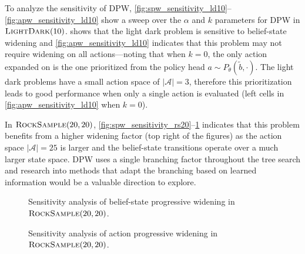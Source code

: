 To analyze the sensitivity of DPW, \cref{fig:spw_sensitivity_ld10}--\ref{fig:apw_sensitivity_ld10} show a sweep over the $\alpha$ and $k$ parameters for DPW in $\textsc{LightDark}(10)$.
 shows that the light dark problem is sensitive to belief-state widening and \cref{fig:apw_sensitivity_ld10} indicates that this problem may not require widening on all actions---noting that when $k=0$, the only action expanded on is the one prioritized from the policy head $a\sim P_\theta(\tilde{b}, \cdot)$.
The light dark problems have a small action space of ${|\mathcal{A}|=3}$, therefore this prioritization leads to good performance when only a single action is evaluated (left cells in \cref{fig:apw_sensitivity_ld10} when $k=0$).

In $\textsc{RockSample}(20,20)$, \cref{fig:spw_sensitivity_rs20}--\ref{fig:apw_sensitivity_rs20} indicates that this problem benefits from a higher widening factor (top right of the figures) as the action space ${|\mathcal{A}|=25}$ is larger and the belief-state transitions operate over a much larger state space.
DPW uses a single branching factor throughout the tree search and research into methods that adapt the branching based on learned information would be a valuable direction to explore.

\begin{figure}[b!]
    \centering
    \begin{minipage}{0.49\linewidth}
        \resizebox{\linewidth}{!}{
            
    }
    \end{minipage}%
    \hspace*{3mm} %
    \begin{minipage}{0.49\linewidth}
        \resizebox{\linewidth}{!}{%
            
        }
    \end{minipage}

    \begin{minipage}[t]{0.49\linewidth}
        \caption{Sensitivity analysis of belief-state progressive widening in $\textsc{RockSample}(20,20)$.}
        \label{fig:spw_sensitivity_rs20}
    \end{minipage}%
    \hspace*{3mm} %
    \begin{minipage}[t]{0.49\linewidth}
        \caption{Sensitivity analysis of action progressive widening in $\textsc{RockSample}(20,20)$.}
        \label{fig:apw_sensitivity_rs20}
    \end{minipage}
\end{figure}

